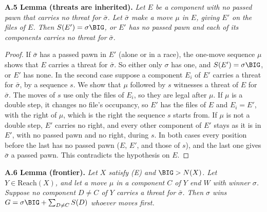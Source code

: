 \textbf{A.5 Lemma (threats are inherited).} \emph{Let $E$ be a component with no passed pawn that carries no threat for
$\bar\sigma$. Let $\bar\sigma$ make a move $\mu$ in $E$, giving $E'$ on the files of $E$. Then $S(E')=\sigma\BIG$, or $E'$ has no passed pawn and each of its components carries no threat for
$\bar\sigma$.}

\begin{proof}
If $\bar\sigma$ has a passed pawn in $E'$ (alone or in a race), the one-move sequence $\mu$ shows that $E$ carries a
threat for $\bar\sigma$. So either only $\sigma$ has one, and $S(E')=\sigma\BIG$, or $E'$ has none. In the second case
suppose a component $E_i$ of $E'$ carries a threat for $\bar\sigma$, by a sequence $s$. We show that $\mu$ followed by $s$
witnesses a threat of $E$ for $\bar\sigma$. The moves of $s$ use only the files of $E_i$, so they are legal after $\mu$. If
$\mu$ is a double step, it changes no file's occupancy, so $E'$ has the files of $E$ and $E_i=E'$, with the right of $\mu$,
which is the right the sequence $s$ starts from. If $\mu$ is not a double step, $E'$ carries no right, and every other
component of $E'$ stays as it is in $E'$, with no passed pawn and no right, during $s$. In both cases every position before
the last has no passed pawn ($E$, $E'$, and those of $s$), and the last one gives $\bar\sigma$ a passed pawn. This
contradicts the hypothesis on $E$.
\end{proof}

\textbf{A.6 Lemma (frontier).} \emph{Let $X$ satisfy (E) and $\BIG>N(X)$. Let $Y\in\mathrm{Reach}(X)$, and let a move
$\mu$ in a component $C$ of $Y$ end $W$ with winner $\sigma$. Suppose no component $D\ne C$ of $Y$ carries a threat for
$\bar\sigma$. Then $\sigma$ wins $G=\sigma\BIG+\sum_{D\ne C}S(D)$ whoever moves first.}

